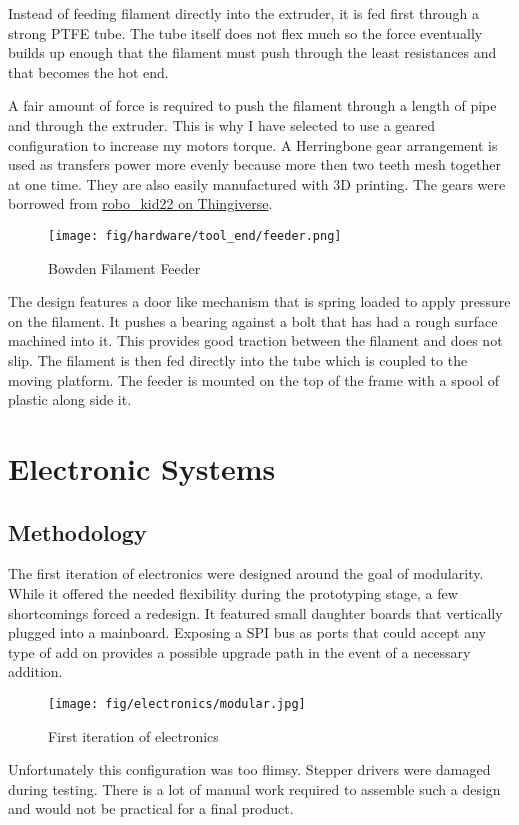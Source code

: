 \documentclass[a4paper, 11pt, twoside]{Thesis}  %
\begin{document}
Instead of feeding filament directly into the extruder, it is fed first through a strong PTFE tube. The tube itself does not flex much so the force eventually builds up enough that the filament must push through the least resistances and that becomes the hot end.

A fair amount of force is required to push the filament through a length of pipe and through the extruder. This is why I have selected to use a geared configuration to increase my motors torque. A Herringbone gear arrangement is used as transfers power more evenly because more then two teeth mesh together at one time. They are also easily manufactured with 3D printing. The gears were borrowed from \href{http://www.thingiverse.com/thing:104615}{robo\_kid22 on Thingiverse}.


\begin{figure}[H]
\centering%
\texttt{[image: fig/hardware/tool\_end/feeder.png]}
\caption{Bowden Filament Feeder}
\label{fig:feeder.png}
\end{figure}
The design features a door like mechanism that is spring loaded to apply pressure on the filament. It pushes a bearing against a bolt that has had a rough surface machined into it. This provides good traction between the filament and does not slip. The filament is then fed directly into the tube which is coupled to the moving platform. The feeder is mounted on the top of the frame with a spool of plastic along side it.


\chapter{Electronic Systems}
\label{Electronic Systems}

\section{Methodology}

The first iteration of electronics were designed around the goal of modularity. While it offered the needed flexibility during the prototyping stage, a few shortcomings forced a redesign. It featured small daughter boards that vertically plugged into a mainboard. Exposing a SPI bus as ports that could accept any type of add on provides a possible upgrade path in the event of a necessary addition. 

\begin{figure}[H]
\centering%
\texttt{[image: fig/electronics/modular.jpg]}
\caption{First iteration of electronics}
\label{fig:modular.jpg}
\end{figure}
Unfortunately this configuration was too flimsy. Stepper drivers were damaged during testing. There is a lot of manual work required to assemble such a design and would not be practical for a final product.
\end{document}
